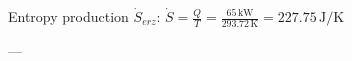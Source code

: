 Entropy production \( \dot{S}_{erz} \):  
\( \dot{S} = \frac{Q}{T} = \frac{65 \, \text{kW}}{293.72 \, \text{K}} = 227.75 \, \text{J/K} \)

---